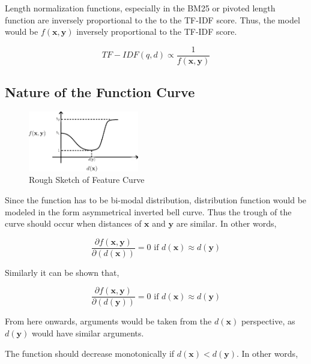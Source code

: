 \documentclass[11pt]{article}
\begin{document}
	
	Length normalization functions, especially in the BM25 or pivoted length function are inversely proportional to the to the TF-IDF score. Thus, the model would be $f(\mathbf{x}, \mathbf{y})$ inversely proportional to the TF-IDF score.
	
	
	\begin{equation*}
		TF-IDF(q, d) \propto \frac{1}{f(\mathbf{x}, \mathbf{y})}
	\end{equation*}
	
	\subsection{Nature of the Function Curve}
	
	\begin{figure}[h]
		\centering
		\includegraphics[width=0.43\textwidth]{Graph1.png}
		\caption{Rough Sketch of Feature Curve}
		\label{sketch}
	\end{figure}
	
	
	Since the function has to be bi-modal distribution, distribution function would be modeled in the form asymmetrical inverted bell curve. Thus the trough of the curve should occur when distances of $\mathbf{x}$ and $\mathbf{y}$ are similar. In other words,
	
	\begin{equation} \label{c1}
		\frac{\partial f(\mathbf{x}, \mathbf{y})}{\partial ( d(\mathbf{x}) )} = 0 \text{ if } d(\mathbf{x}) \approx d(\mathbf{y})
	\end{equation}
	
	Similarly it can be shown that,
	
	\begin{equation*}
		\frac{\partial f(\mathbf{x}, \mathbf{y})}{\partial (d(\mathbf{y}))} = 0 \text{ if } d(\mathbf{x}) \approx d(\mathbf{y})
	\end{equation*}
	
	From here onwards, arguments would be taken from the $d(\mathbf{x})$ perspective, as $d(\mathbf{y})$ would have similar arguments.
	
	The function should decrease monotonically if $d(\mathbf{x}) < d(\mathbf{y})$. In other words, 
	
\end{document}
